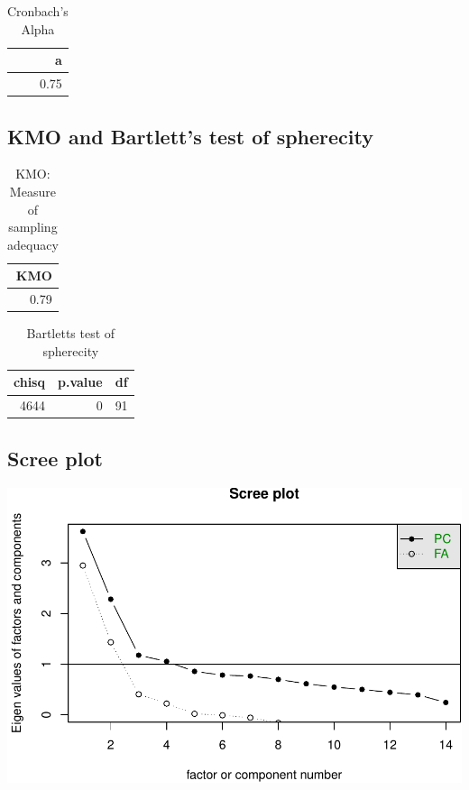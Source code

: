 \documentclass[]{article}
\begin{document}
\begin{table}[H]

\caption{\label{tab:unnamed-chunk-18}Cronbach's Alpha}
\centering
\fontsize{6}{8}\selectfont
\begin{tabular}[t]{r}
\toprule
a\\
\midrule
0.75\\
\bottomrule
\end{tabular}
\end{table}

\hypertarget{kmo-and-bartletts-test-of-spherecity-3}{%
\subsection{KMO and Bartlett's test of
spherecity}\label{kmo-and-bartletts-test-of-spherecity-3}}

\begin{table}[H]

\caption{\label{tab:unnamed-chunk-19}KMO: Measure of sampling adequacy}
\centering
\fontsize{6}{8}\selectfont
\begin{tabular}[t]{r}
\toprule
KMO\\
\midrule
0.79\\
\bottomrule
\end{tabular}
\end{table}

\begin{table}[H]

\caption{\label{tab:unnamed-chunk-19}Bartletts test of spherecity}
\centering
\fontsize{6}{8}\selectfont
\begin{tabular}[t]{rrr}
\toprule
chisq & p.value & df\\
\midrule
4644 & 0 & 91\\
\bottomrule
\end{tabular}
\end{table}

\hypertarget{scree-plot-3}{%
\subsection{Scree plot}\label{scree-plot-3}}

\includegraphics{PCA_covid_files/figure-latex/unnamed-chunk-20-1.pdf}
\end{document}
